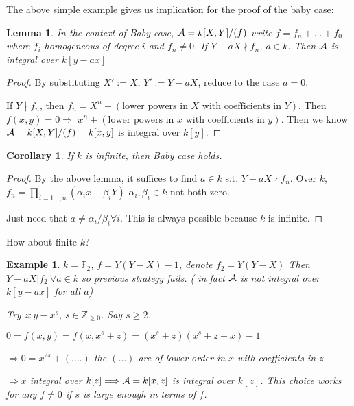 \documentclass[11pt]{article}
\newtheorem{lemma}[thm]{Lemma}
\newtheorem{cor}[thm]{Corollary}
\newtheorem{ex}[thm]{Example}
\newcommand{\intg}{\mathbb Z}
\newcommand{\bbf}{\mathbb F}
\newcommand{\cala}{{\cal A}}
\newcommand{\Lrta}{\Longrightarrow}
\begin{document}
The above simple example gives us implication for the proof of the baby case:
\begin{lemma}
In the context of Baby case, $\cala=k[X,Y]/(f)$ write $f=f_n+...+f_0$. where $f_i$ homogeneous of degree $i$ and $f_n\neq 0$. If $Y-aX\nmid f_n$, $a\in k$. Then $\cala$ is integral over $k[y-ax]$
\end{lemma}
\begin{proof}
By substituting $X':=X$, $Y':=Y-aX$, reduce to the case $a=0$.

If $Y\nmid f_n$, then $f_n=X^{n}+(\text{lower powers in $X$ with coefficients in $Y$})$. Then $f(x,y)=0\Lrta$ $x^n+(\text{lower powers in $x$ with coefficients in $y$})$. Then we know $\cala=k[X,Y]/(f)=k[x,y]$ is integral over $k[y]$.
\end{proof}
\begin{cor}
If $k$ is infinite, then Baby case holds.
\end{cor}
\begin{proof}
By the above lemma, it suffices to find $a\in k$ s.t. $Y-aX\nmid f_n$. Over $\overline{k}$, $f_n=\prod_{i=1...,n} (\alpha_i x-\beta_i Y)$ $\alpha_i,\beta_i\in \overline{k}$ not both zero. 

Just need that $a\neq \alpha_i/\beta_i\forall i$. This is always possible because $k$ is infinite.
\end{proof}

How about finite $k$?

\begin{ex}
$k=\bbf_2$, $f=Y(Y-X)-1$, denote $f_2=Y(Y-X)$ Then $Y-aX|f_2\ \forall a\in k$ so previous strategy fails. ( in fact $\cala$ is not integral over $k[y-ax]$ for all $a$)

Try $z:y-x^s$, $s\in \intg_{\geq 0}$. Say $s\geq 2$.

$0=f(x,y)=f(x,x^s+z)=(x^s+z)(x^s+z-x)-1$

$\Lrta 0=x^{2s}+(....)$ the $(...)$ are of lower order in $x$ with coefficients in $z$

$\Lrta x$ integral over $k[z]\Lrta\cala=k[x,z]$ is integral over $k[z]$. This choice works for any $f\neq 0$ if $s$ is large enough in terms of $f$.
\end{ex}
\end{document}
